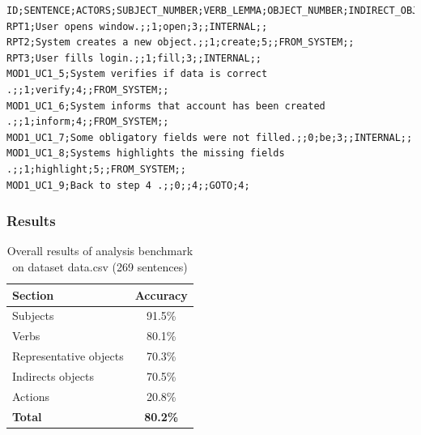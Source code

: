 \begin{table}[ht]   %
\begin{center}
    \begin{verbatim}      
ID;SENTENCE;ACTORS;SUBJECT_NUMBER;VERB_LEMMA;OBJECT_NUMBER;INDIRECT_OBJECT_NUMBER;ACTION_CODE;ACTION_PARAM1;ACTION_PARAM2
RPT1;User opens window.;;1;open;3;;INTERNAL;;
RPT2;System creates a new object.;;1;create;5;;FROM_SYSTEM;;
RPT3;User fills login.;;1;fill;3;;INTERNAL;;
MOD1_UC1_5;System verifies if data is correct .;;1;verify;4;;FROM_SYSTEM;;
MOD1_UC1_6;System informs that account has been created .;;1;inform;4;;FROM_SYSTEM;;
MOD1_UC1_7;Some obligatory fields were not filled.;;0;be;3;;INTERNAL;;
MOD1_UC1_8;Systems highlights the missing fields .;;1;highlight;5;;FROM_SYSTEM;;
MOD1_UC1_9;Back to step 4 .;;0;;4;;GOTO;4;
    \end{verbatim}
  \caption{Example input for benchmark plugin}
  \label{tab.benchmarkinput}
\end{center}
\end{table}      
      
\subsubsection{Results}
                        
\begin{table}[ht]   %
\begin{center}
    \begin{tabular}{|l|c|}
      \hline
      {\bf Section} & {\bf Accuracy} \\
      \hline
      Subjects               & 91.5\% \\
      Verbs                  & 80.1\% \\
      Representative objects & 70.3\% \\
      Indirects objects      & 70.5\% \\
      Actions                & 20.8\% \\
      \hline
      {\bf Total} & {\bf 80.2\%} \\
      \hline
    \end{tabular}
 \caption{Overall results of analysis benchmark on dataset data.csv (269 sentences)}
 \label{tab.benchmark}
\end{center}
\end{table}

